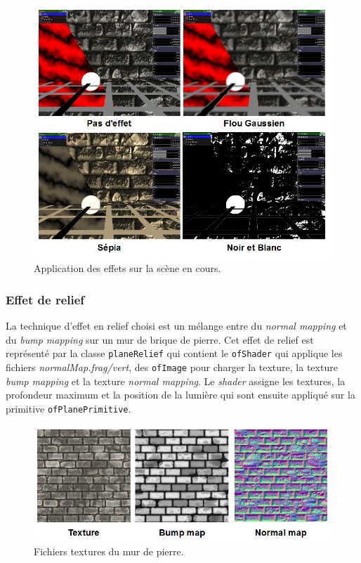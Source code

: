 \begin{figure}[H]
    \centering
	\includegraphics[scale=0.8]{img/infog-image-effet-plein-ecran.png}
	\caption{Application des effets sur la scène en cours.}
	\label{fig:effects}
\end{figure}


\subsubsection{Effet de relief}
La technique d'effet en relief choisi est un mélange entre du \textit{normal mapping} et du \textit{bump mapping} sur un mur de brique de pierre. Cet effet de relief est représenté par la classe \texttt{planeRelief} qui contient le \texttt{ofShader} qui applique les fichiers \textit{normalMap.frag/vert}, des \texttt{ofImage} pour charger la texture, la texture \textit{bump mapping} et la texture \textit{normal mapping}. Le \textit{shader} assigne les textures, la profondeur maximum et la position de la lumière qui sont ensuite appliqué sur la primitive \texttt{ofPlanePrimitive}.

\begin{figure}[H]
    \centering
	\includegraphics[scale=0.8]{img/infog-image-mur-pierre.png}
	\caption{Fichiers textures du mur de pierre.}
	\label{fig:wallfiles}
\end{figure}

